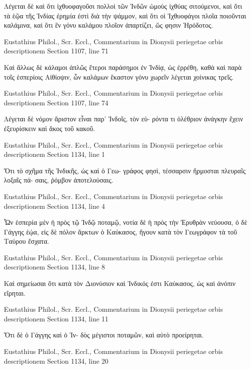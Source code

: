 \documentclass[12pt,letterpaper,twoside,final]{memoir}
\begin{document}
\begin{greek}
Λέγεται δὲ καὶ ὅτι ἰχθυοφαγοῦσι πολλοὶ τῶν Ἰνδῶν 
ὠμοὺς ἰχθύας σιτούμενοι, καὶ ὅτι τὰ ἑῷα τῆς Ἰνδίας 
ἐρημία ἐστὶ διὰ τὴν ψάμμον, καὶ ὅτι οἱ Ἰχθυοφάγοι 
πλοῖα ποιοῦνται καλάμινα, καὶ ὅτι ἓν γόνυ καλάμου 
πλοῖον ἀπαρτίζει, ὥς φησιν Ἡρόδοτος. 



Eustathius Philol., Scr. Eccl., Commentarium in Dionysii periegetae orbis descriptionem 
Section 1107, line 71

                                                          Καὶ 
ἄλλως δὲ κάλαμοι ἁπλῶς ἕτεροι παράσημοι ἐν Ἰνδίᾳ, 
ὡς ἐρρέθη, καθὰ καὶ παρὰ τοῖς ἑσπερίοις Αἰθίοψιν, ὧν 
καλάμων ἕκαστον γόνυ χωρεῖν λέγεται χοίνικας τρεῖς. 



Eustathius Philol., Scr. Eccl., Commentarium in Dionysii periegetae orbis descriptionem 
Section 1107, line 74

Λέγεται δὲ νόμον ἄριστον εἶναι παρ' Ἰνδοῖς, τὸν εὑ-
ρόντα τι ὀλέθριον ἀνάγκην ἔχειν ἐξευρίσκειν καὶ ἄκος 
τοῦ κακοῦ. 



Eustathius Philol., Scr. Eccl., Commentarium in Dionysii periegetae orbis descriptionem 
Section 1134, line 1

Ὅτι τὸ σχῆμα τῆς Ἰνδικῆς, ὡς καὶ ὁ Γεω-
γράφος φησὶ, τέσσαρσιν ἥρμοσται πλευραῖς λοξαῖς πά-
σαις, ῥόμβον ἀποτελούσαις. 



Eustathius Philol., Scr. Eccl., Commentarium in Dionysii periegetae orbis descriptionem 
Section 1134, line 4

                               Ὧν ἑσπερία μὲν ἡ πρὸς 
τῷ Ἰνδῷ ποταμῷ, νοτία δὲ ἡ πρὸς τὴν Ἐρυθρὰν 
νεύουσα, ὁ δὲ Γάγγης ἑῴα, εἰς δὲ πόλον ἄρκτων ὁ 
Καύκασος, ἤγουν κατὰ τὸν Γεωγράφον τὰ τοῦ Ταύρου 
ἔσχατα. 



Eustathius Philol., Scr. Eccl., Commentarium in Dionysii periegetae orbis descriptionem 
Section 1134, line 8

          Καὶ σημείωσαι ὅτι κατὰ τὸν Διονύσιον καὶ 
Ἰνδικός ἐστι Καύκασος, ὡς καὶ ἀνόπιν εἴρηται. 



Eustathius Philol., Scr. Eccl., Commentarium in Dionysii periegetae orbis descriptionem 
Section 1134, line 11

                         Ὅτι δὲ ὁ Γάγγης καὶ ὁ Ἰν-
δὸς μέγιστοι ποταμῶν, καὶ αὐτὸ προείρηται. 



Eustathius Philol., Scr. Eccl., Commentarium in Dionysii periegetae orbis descriptionem 
Section 1134, line 20


\end{greek}
\end{document}
